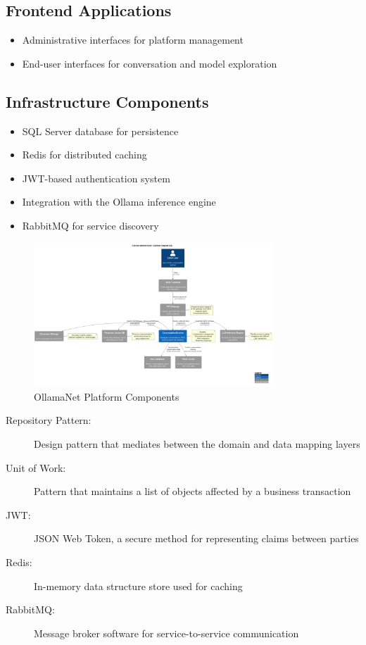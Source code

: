 \subsection{Frontend Applications}
\begin{itemize}
    \item Administrative interfaces for platform management
    \item End-user interfaces for conversation and model exploration
\end{itemize}

\subsection{Infrastructure Components}
\begin{itemize}
    \item SQL Server database for persistence
    \item Redis for distributed caching
    \item JWT-based authentication system
    \item Integration with the Ollama inference engine
    \item RabbitMQ for service discovery
\end{itemize}

\begin{figure}
    \centering
    \includegraphics[width=0.8\textwidth]{./Chapter01/figures/ConversationService_Context.png}
    \caption{OllamaNet Platform Components}
    \label{fig:ollamanet-platform-components}
\end{figure}

\begin{terminology}
\begin{description}
    \item[Repository Pattern:] Design pattern that mediates between the domain and data mapping layers
    \item[Unit of Work:] Pattern that maintains a list of objects affected by a business transaction
    \item[JWT:] JSON Web Token, a secure method for representing claims between parties
    \item[Redis:] In-memory data structure store used for caching
    \item[RabbitMQ:] Message broker software for service-to-service communication
\end{description}
\end{terminology}

